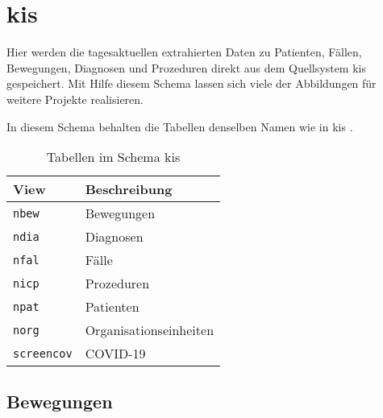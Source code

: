 \chapter{\acs{kis}} \label{chp:kis}

Hier werden die tagesaktuellen extrahierten Daten zu Patienten, Fällen, Bewegungen, Diagnosen und Prozeduren direkt aus dem Quellsystem \ac{kis} gespeichert. Mit Hilfe diesem Schema lassen sich viele der Abbildungen für weitere Projekte realisieren.

In diesem Schema behalten die Tabellen denselben Namen wie in \ac{kis} . 
\begin{table}[ht]
	\centering   
	\caption{Tabellen im Schema kis}
	\begin{tabular}{||l|l||}   		
		\hline
		View & Beschreibung \\ [0.5ex]
		\hline\hline
		\texttt{nbew} & Bewegungen \\
		\hline
		\texttt{ndia} & Diagnosen \\
		\hline
		\texttt{nfal} & Fälle \\
		\hline
		\texttt{nicp} & Prozeduren \\
		\hline
		\texttt{npat} & Patienten \\
		\hline
		\texttt{norg} & Organisationseinheiten \\
		\hline
		\texttt{screencov} & COVID-19 \\
		\hline
	\end{tabular}
\end{table}

\section{Bewegungen}
